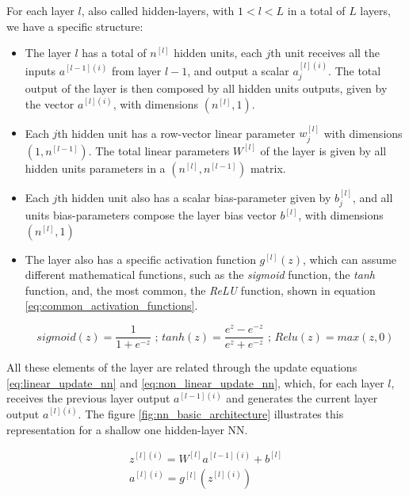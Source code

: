 For each layer $l$, also called hidden-layers, with $1<l<L$ in a total of $L$ layers, we have a specific structure:
\begin{itemize}

\item
	The layer $l$ has a total of $n^{[l]}$ hidden units, each $j$th unit receives all the inputs $a^{[l-1](i)}$ from layer $l-1$, and output a scalar $a^{[l](i)}_j$. The total output of the layer is then composed by all hidden units outputs, given by the vector $a^{[l](i)}$, with dimensions $(n^{[l]},1)$.
	
\item
	Each $j$th hidden unit has a row-vector linear parameter $w^{[l]}_j$ with dimensions $(1,n^{[l-1]})$. The total linear parameters $W^{[l]}$ of the layer is given by all hidden units parameters in a $(n^{[l]},n^{[l-1]})$ matrix.
	
\item
	Each $j$th hidden unit also has a scalar bias-parameter given by $b^{[l]}_j$, and all units bias-parameters compose the layer bias vector $b^{[l]}$, with dimensions $(n^{[l]},1)$
	
\item
	The layer also has a specific activation function $g^{[l]}(z)$, which can assume different mathematical functions, such as the \textit{sigmoid} function, the \textit{tanh} function, and, the most common, the \textit{ReLU} function, shown in equation \ref{eq:common_activation_functions}.

\begin{equation}
sigmoid(z) = \frac{1}{1+e^{-z}} \text{ ; } tanh(z) = \frac{e^z - e^{-z}}{e^z + e^{-z}} \text{ ; } Relu(z) = max(z,0)
\label{eq:common_activation_functions}
\end{equation}

\end{itemize}

All these elements of the layer are related through the update equations \ref{eq:linear_update_nn} and \ref{eq:non_linear_update_nn}, which, for each layer $l$, receives the previous layer output $a^{[l-1](i)}$ and generates the current layer output $a^{[l](i)}$. The figure \ref{fig:nn_basic_architecture} illustrates this representation for a shallow one hidden-layer NN.

\begin{align}
z^{[l](i)} = W^{[l]}a^{[l-1](i)} + b^{[l]}
\label{eq:linear_update_nn}
\\
a^{[l](i)} = g^{[l]}(z^{[l](i)})
\label{eq:non_linear_update_nn}
\end{align}

